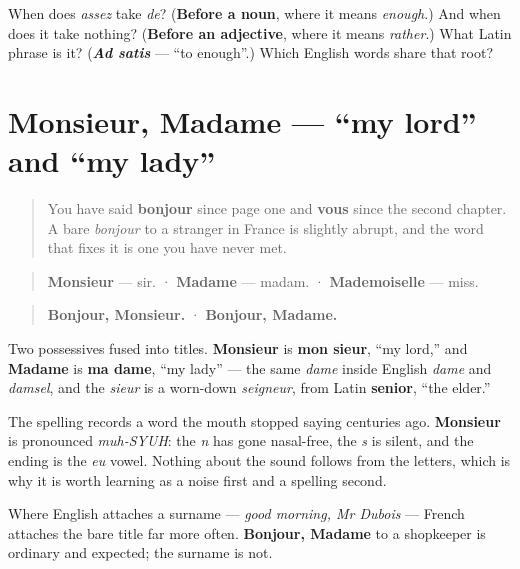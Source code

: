 \begin{tcolorbox}[breakable,colback=teal!4,colframe=teal!35!black,title={Before you move on}]
When does \emph{assez} take \emph{de}? (\textbf{Before a noun}, where it means \emph{enough}.) And when does it take nothing? (\textbf{Before an adjective}, where it means \emph{rather}.) What Latin phrase is it? (\emph{\textbf{Ad satis}} — \textquotedblleft{}to enough\textquotedblright{}.) Which English words share that root?
\end{tcolorbox}
\section[Monsieur, Madame]{Monsieur, Madame — \textquotedblleft{}my lord\textquotedblright{} and \textquotedblleft{}my lady\textquotedblright{}}

\label{lesson:FR-C40-monsieur}



\begin{quote}
You have said \textbf{bonjour} since page one and \textbf{vous} since the second chapter. A bare \emph{bonjour} to a stranger in France is slightly abrupt, and the word that fixes it is one you have never met.
\end{quote}

\begin{cousinweb}
\begin{quote}
\textbf{Monsieur} — sir. · \textbf{Madame} — madam. · \textbf{Mademoiselle} — miss.
\end{quote}

\begin{quote}
\textbf{Bonjour, Monsieur.} · \textbf{Bonjour, Madame.}
\end{quote}

Two possessives fused into titles. \textbf{Monsieur} is \textbf{mon sieur}, \textquotedblleft{}my lord,\textquotedblright{} and \textbf{Madame} is \textbf{ma dame}, \textquotedblleft{}my lady\textquotedblright{} — the same \emph{dame} inside English \emph{dame} and \emph{damsel}, and the \emph{sieur} is a worn-down \emph{seigneur}, from Latin \textbf{senior}, \textquotedblleft{}the elder.\textquotedblright{}

The spelling records a word the mouth stopped saying centuries ago. \textbf{Monsieur} is pronounced \emph{muh-SYUH}: the \emph{n} has gone nasal-free, the \emph{s} is silent, and the ending is the \emph{eu} vowel. Nothing about the sound follows from the letters, which is why it is worth learning as a noise first and a spelling second.

Where English attaches a surname — \emph{good morning, Mr Dubois} — French attaches the bare title far more often. \textbf{Bonjour, Madame} to a shopkeeper is ordinary and expected; the surname is not.
\end{cousinweb}

